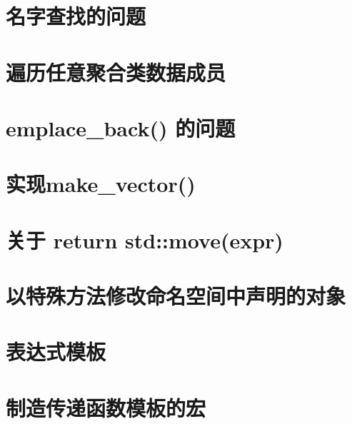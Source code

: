\documentclass[11pt,fancyhdr]{ctexart}
\begin{document}
\section{名字查找的问题}


\section{遍历任意聚合类数据成员}


\section{emplace\_back() 的问题}


\section{实现make\_vector()}


\section{关于 return std::move(expr)}


\section{以特殊方法修改命名空间中声明的对象}


\section{表达式模板}


\section{制造传递函数模板的宏}

\end{document}
